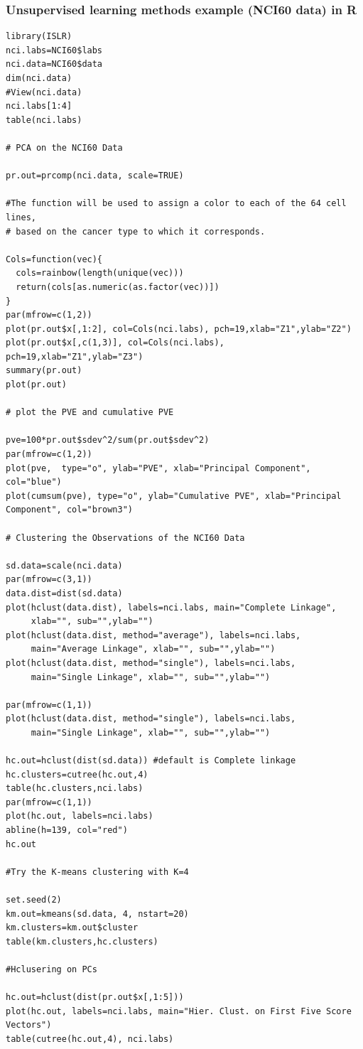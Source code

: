 \documentclass[11pt]{article}
\begin{document}
\subsubsection{Unsupervised learning methods example (NCI60 data) in R}
\begin{lstlisting}
library(ISLR)
nci.labs=NCI60$labs
nci.data=NCI60$data
dim(nci.data)
#View(nci.data)
nci.labs[1:4]
table(nci.labs)

# PCA on the NCI60 Data

pr.out=prcomp(nci.data, scale=TRUE)

#The function will be used to assign a color to each of the 64 cell lines, 
# based on the cancer type to which it corresponds.

Cols=function(vec){
  cols=rainbow(length(unique(vec)))
  return(cols[as.numeric(as.factor(vec))])
}
par(mfrow=c(1,2))
plot(pr.out$x[,1:2], col=Cols(nci.labs), pch=19,xlab="Z1",ylab="Z2")
plot(pr.out$x[,c(1,3)], col=Cols(nci.labs), pch=19,xlab="Z1",ylab="Z3")
summary(pr.out)
plot(pr.out)

# plot the PVE and cumulative PVE

pve=100*pr.out$sdev^2/sum(pr.out$sdev^2)
par(mfrow=c(1,2))
plot(pve,  type="o", ylab="PVE", xlab="Principal Component", col="blue")
plot(cumsum(pve), type="o", ylab="Cumulative PVE", xlab="Principal Component", col="brown3")

# Clustering the Observations of the NCI60 Data

sd.data=scale(nci.data)
par(mfrow=c(3,1))
data.dist=dist(sd.data)
plot(hclust(data.dist), labels=nci.labs, main="Complete Linkage", 
     xlab="", sub="",ylab="")
plot(hclust(data.dist, method="average"), labels=nci.labs, 
     main="Average Linkage", xlab="", sub="",ylab="")
plot(hclust(data.dist, method="single"), labels=nci.labs,  
     main="Single Linkage", xlab="", sub="",ylab="")

par(mfrow=c(1,1))
plot(hclust(data.dist, method="single"), labels=nci.labs,  
     main="Single Linkage", xlab="", sub="",ylab="")

hc.out=hclust(dist(sd.data)) #default is Complete linkage
hc.clusters=cutree(hc.out,4)
table(hc.clusters,nci.labs)
par(mfrow=c(1,1))
plot(hc.out, labels=nci.labs)
abline(h=139, col="red")
hc.out

#Try the K-means clustering with K=4

set.seed(2)
km.out=kmeans(sd.data, 4, nstart=20)
km.clusters=km.out$cluster
table(km.clusters,hc.clusters)

#Hclusering on PCs

hc.out=hclust(dist(pr.out$x[,1:5]))
plot(hc.out, labels=nci.labs, main="Hier. Clust. on First Five Score Vectors")
table(cutree(hc.out,4), nci.labs)
\end{lstlisting}
\end{document}
